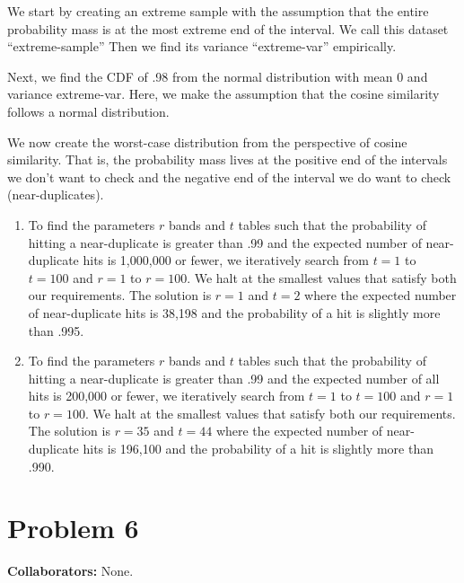 We start by creating an extreme sample
with the assumption that the entire
probability mass is at the most extreme
end of the interval.
We call this dataset ``extreme-sample''
Then we find its variance ``extreme-var''
empirically.

Next, we find the CDF of .98 from the normal
distribution with mean 0 and variance
extreme-var.
Here, we make the assumption that the
cosine similarity follows a normal distribution.

We now create the worst-case distribution
from the perspective of cosine similarity.
That is, the probability mass lives at the
positive end of the intervals we don't want
to check and the negative end of the interval
we do want to check (near-duplicates).

\begin{enumerate}
    \item
    To find the parameters $r$ bands and $t$ tables
    such that the probability of hitting a near-duplicate
    is greater than .99 and the expected number
    of near-duplicate hits is 1,000,000 or fewer,
    we iteratively search from $t=1$ to $t=100$ and
    $r=1$ to $r=100$.
    We halt at the smallest values that satisfy
    both our requirements.
    The solution is $r=1$ and $t=2$ where
    the expected number of near-duplicate hits
    is 38,198 and the probability of a hit
    is slightly more than .995.

    \item
    To find the parameters $r$ bands and $t$ tables
    such that the probability of hitting a near-duplicate
    is greater than .99 and the expected number
    of all hits is 200,000 or fewer,
    we iteratively search from $t=1$ to $t=100$ and
    $r=1$ to $r=100$.
    We halt at the smallest values that satisfy
    both our requirements.
    The solution is $r=35$ and $t=44$ where
    the expected number of near-duplicate hits
    is 196,100 and the probability of a hit
    is slightly more than .990.
\end{enumerate}




\newpage
\section*{Problem 6}
\textbf{Collaborators:}  None.
\medskip

